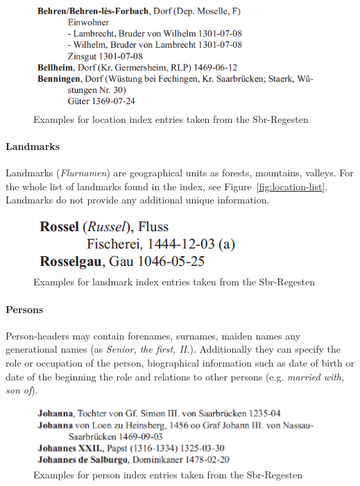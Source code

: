 \begin{figure}[h]
  \centering
  \includegraphics[scale=0.45]{img/location-example}
  \caption{Examples for location index entries taken from the
    Sbr-Regesten}
  \label{fig:location-example}
\end{figure}

\paragraph{Landmarks}
Landmarks (\textit{Flurnamen}) are geographical units as forests,
mountains, valleys. For the whole list of landmarks found in the
index, see Figure~\ref{fig:location-list}. Landmarks do not provide
any additional unique
information.%

\begin{figure}[h]
  \centering
  \includegraphics[scale=0.45]{img/landmark-example}
  \caption{Examples for landmark index entries taken from the
    Sbr-Regesten}
  \label{fig:landmark-example}
\end{figure}

\paragraph{Persons}
Person-headers may contain forenames, surnames, maiden names any
generational names (as \textit{Senior, the first, II.}). Additionally
they can specify the role or occupation of the person, biographical
information such as date of birth or date of the beginning the role
and relations to other persons (e.g. \textit{married with, son
  of}).%
\begin{figure}[h]
  \centering
  \includegraphics[scale=0.45]{img/person-example}
  \caption{Examples for person index entries taken from the
    Sbr-Regesten}
  \label{fig:person-example}
\end{figure}

